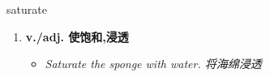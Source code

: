 
\begin{frame}
{\huge saturate}
\begin{center}
\begin{enumerate}\Large
  \item \textbf{v./adj. 使饱和,浸透}
  \begin{itemize}
    \item \em{\Large{Saturate the sponge with water. 将海绵浸透}}
  \end{itemize}
\end{enumerate}
\end{center}
\end{frame}
